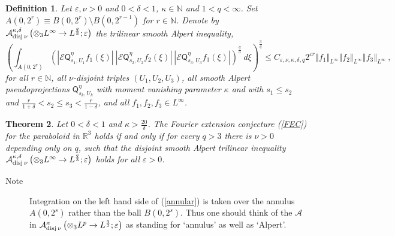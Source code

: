 \documentclass{amsart}%
\newtheorem{theorem}{Theorem}
\theoremstyle{plain}
\newtheorem{definition}[theorem]{Definition}
\numberwithin{equation}{section}
\begin{document}
\begin{definition}
Let $\varepsilon,\nu>0$ and $0<\delta<1$, $\kappa\in\mathbb{N}$ and
$1<q<\infty$. Set $A\left(  0,2^{r}\right)  \equiv B\left(  0,2^{r}\right)
\setminus B\left(  0,2^{r-1}\right)  $ for $r\in\mathbb{N}$. Denote by
$\mathcal{A}_{\mathop{\rm disj}\nu}^{\kappa,\delta}\left(  \otimes
_{3}L^{\infty}\rightarrow L^{\frac{q}{3}};\varepsilon\right)  $ the trilinear
smooth Alpert inequality,%
\begin{equation}
\left(  \int_{A\left(  0,2^{r}\right)  }\left(  \left\vert \mathcal{E}%
\mathsf{Q}_{s_{1},U_{1}}^{\eta}f_{1}\left(  \xi\right)  \right\vert
\ \left\vert \mathcal{E}\mathsf{Q}_{s_{2},U_{2}}^{\eta}f_{2}\left(
\xi\right)  \right\vert \ \left\vert \mathcal{E}\mathsf{Q}_{s_{3},U_{3}}%
^{\eta}f_{3}\left(  \xi\right)  \right\vert \right)  ^{\frac{q}{3}}%
\ d\xi\right)  ^{\frac{3}{q}}\leq C_{\varepsilon,\nu,\kappa,\delta
,q}2^{\varepsilon r}\left\Vert f_{1}\right\Vert _{L^{\infty}}\left\Vert
f_{2}\right\Vert _{L^{\infty}}\left\Vert f_{3}\right\Vert _{L^{\infty}%
}\ ,\label{annular}%
\end{equation}
for all $r\in\mathbb{N}$, all $\nu$\emph{-disjoint} triples $\left(
U_{1},U_{2},U_{3}\right)  $, all smooth Alpert pseudoprojections
$\mathsf{Q}_{s_{k},U_{k}}^{\eta}$ with moment vanishing parameter $\kappa$ and
with $s_{1}\leq s_{2}$ and $\frac{r}{1+\delta}<s_{2}\leq s_{3}<\frac
{r}{1-\delta} $, and all $f_{1},f_{2},f_{3}\in L^{\infty}$.
\end{definition}

\begin{theorem}
\label{main Alpert}Let $0<\delta<1$ and $\kappa>\frac{20}{\delta}$. The
Fourier extension conjecture (\ref{FEC}) for the paraboloid in $\mathbb{R}%
^{3}$ holds \emph{if and only if} for every $q>3$ there is $\nu>0$ depending
only on $q$, such that the disjoint \emph{smooth Alpert }trilinear inequality
$\mathcal{A}_{\mathop{\rm disj}\nu}^{\kappa,\delta}\left(  \otimes
_{3}L^{\infty}\rightarrow L^{\frac{q}{3}};\varepsilon\right)  $ holds for all
$\varepsilon>0$.
\end{theorem}

\begin{description}
\item[Note] Integration on the left hand side of (\ref{annular}) is taken over
the annulus $A\left(  0,2^{s}\right)  $ rather than the ball $B\left(
0,2^{s}\right)  $. Thus one should think of the $\mathcal{A}$ in
$\mathcal{A}_{\mathop{\rm disj}\nu}^{\kappa}\left(  \otimes_{3}L^{p}%
\rightarrow L^{\frac{q}{3}};\varepsilon\right)  $ as standing for `annulus' as
well as `Alpert'.
\end{description}
\end{document}
